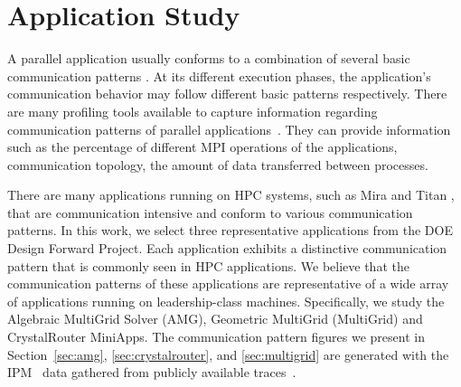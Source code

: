 
\section{Application Study}
\label{sec:application study}


A parallel application usually conforms to a combination of several basic communication patterns \cite{roth}. At its different execution phases, the application's communication behavior may follow different basic patterns respectively. There are many profiling tools available to capture information regarding communication patterns of parallel applications~\cite{tau,mpip,scala,sst,oxbow}. They can provide information such as the percentage of different MPI operations of the applications, communication topology, the amount of data transferred between processes.

There are many applications running on HPC systems, such as Mira \cite{bgq} and Titan \cite{titan}, that are communication intensive and conform to various communication patterns. In this work, we select three representative applications from the DOE Design Forward Project. Each application exhibits a distinctive communication pattern that is commonly seen in HPC applications. We believe that the communication patterns of these applications are representative of a wide array of applications running on leadership-class machines. Specifically, we study the Algebraic MultiGrid Solver (AMG), Geometric MultiGrid (MultiGrid) and CrystalRouter MiniApps. The communication pattern figures we present in Section~\ref{sec:amg}, \ref{sec:crystalrouter}, and \ref{sec:multigrid} are generated with the IPM~\cite{ipm} data gathered from publicly available traces~\cite{designforwardwebpage}.

